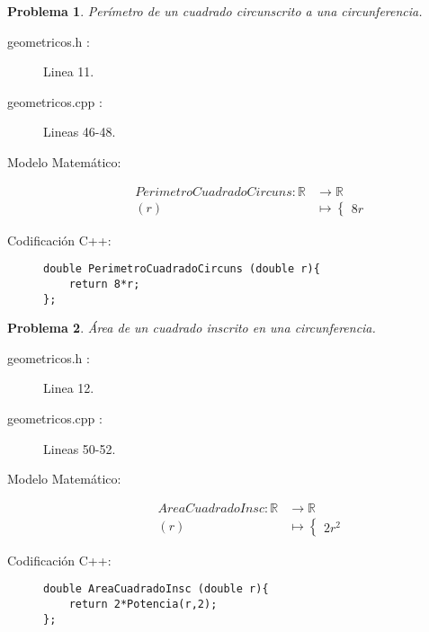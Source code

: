 \documentclass{article}
\theoremstyle{plain}
\theoremstyle{definition}
\newtheorem{problem}{Problema}
\begin{document}
\begin{problem} \emph{Perímetro de un cuadrado circunscrito a una circunferencia.}\\
\begin{description}
\item[geometricos.h :] Linea 11. \item[geometricos.cpp :] Lineas 46-48.

\item[Modelo Matemático:]
\begin{align*}
PerimetroCuadradoCircuns: \mathbb{R} &\to \mathbb{R}\\
(r) &\mapsto \begin{cases}
8r
\end{cases}
\end{align*}
%
\item[Codificación \textsf{C++}:]\hfill
%
\begin{verbatim}
double PerimetroCuadradoCircuns (double r){
    return 8*r;
};
\end{verbatim}
\end{description}
\end{problem}

\begin{problem} \emph{Área de un cuadrado inscrito en una circunferencia.}\\
\begin{description}
\item[geometricos.h :] Linea 12. \item[geometricos.cpp :] Lineas 50-52.

\item[Modelo Matemático:]
\begin{align*}
AreaCuadradoInsc: \mathbb{R} &\to \mathbb{R}\\
(r) &\mapsto \begin{cases}
2r^{2}
\end{cases}
\end{align*}
%
\item[Codificación \textsf{C++}:]\hfill
%
\begin{verbatim}
double AreaCuadradoInsc (double r){
    return 2*Potencia(r,2);
};
\end{verbatim}
\end{description}
\end{problem}
\end{document}
